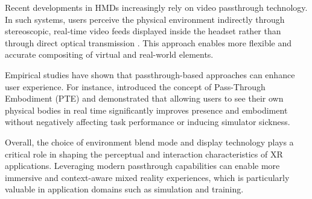 Recent developments in HMDs increasingly rely on video passthrough technology. In such systems, users perceive the physical environment indirectly through stereoscopic, real-time video feeds displayed inside the headset rather than through direct optical transmission \parencite{bailenson2024passthrough}. This approach enables more flexible and accurate compositing of virtual and real-world elements.

Empirical studies have shown that passthrough-based approaches can enhance user experience. For instance, \textcite{waldow_investigating_2025} introduced the concept of Pass-Through Embodiment (PTE) and demonstrated that allowing users to see their own physical bodies in real time significantly improves presence and embodiment without negatively affecting task performance or inducing simulator sickness.

Overall, the choice of environment blend mode and display technology plays a critical role in shaping the perceptual and interaction characteristics of XR applications. Leveraging modern passthrough capabilities can enable more immersive and context-aware mixed reality experiences, which is particularly valuable in application domains such as simulation and training.